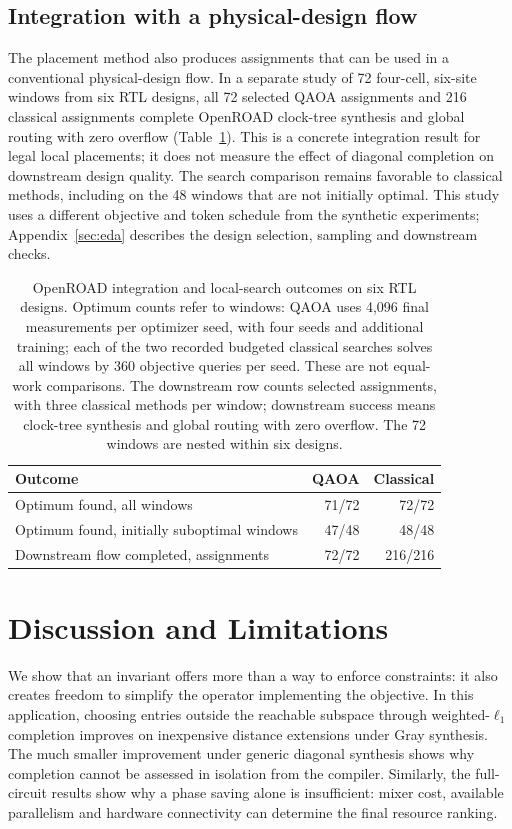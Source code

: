 \documentclass[manuscript,screen,review]{acmart}
\begin{document}
\subsection{Integration with a physical-design flow}
\label{sec:eda-results}
The placement method also produces assignments that can be used in a
conventional physical-design flow. In a separate study of 72 four-cell,
six-site windows from six RTL designs, all 72 selected QAOA assignments and
216 classical assignments complete OpenROAD clock-tree synthesis and global
routing with zero overflow (Table~\ref{tab:eda-integration}). This is a
concrete integration result for legal local placements; it does not measure
the effect of diagonal completion on downstream design quality. The search
comparison remains favorable to classical methods, including on the 48
windows that are not initially optimal. This study uses a different objective
and token schedule from the synthetic experiments; Appendix~\ref{sec:eda}
describes the design selection, sampling and downstream checks.

\begin{table}[t]
\centering\small
\caption{OpenROAD integration and local-search outcomes on six RTL designs.
Optimum counts refer to windows: QAOA uses 4,096 final measurements per
optimizer seed, with four seeds and additional training; each of the two
recorded budgeted classical searches solves all windows by 360 objective
queries per seed. These are not equal-work comparisons. The downstream row
counts selected assignments, with three classical methods per window;
downstream success means clock-tree synthesis and global routing with
zero overflow. The 72 windows are nested within six designs.}
\label{tab:eda-integration}
\begin{tabular}{lrr}
\toprule
Outcome & QAOA & Classical \\
\midrule
Optimum found, all windows & 71/72 & 72/72 \\
Optimum found, initially suboptimal windows & 47/48 & 48/48 \\
Downstream flow completed, assignments & 72/72 & 216/216 \\
\bottomrule
\end{tabular}
\end{table}

\section{Discussion and Limitations}
We show that an invariant offers more than a way to enforce constraints:
it also creates freedom to simplify the operator implementing the objective.
In this application, choosing entries outside the reachable subspace through
weighted-$\ell_1$ completion improves on inexpensive distance
extensions under Gray synthesis. The much smaller improvement under generic
diagonal synthesis shows why completion cannot be assessed in isolation
from the compiler. Similarly, the full-circuit results show why a phase
saving alone is insufficient: mixer cost, available parallelism and hardware
connectivity can determine the final resource ranking.
\end{document}
